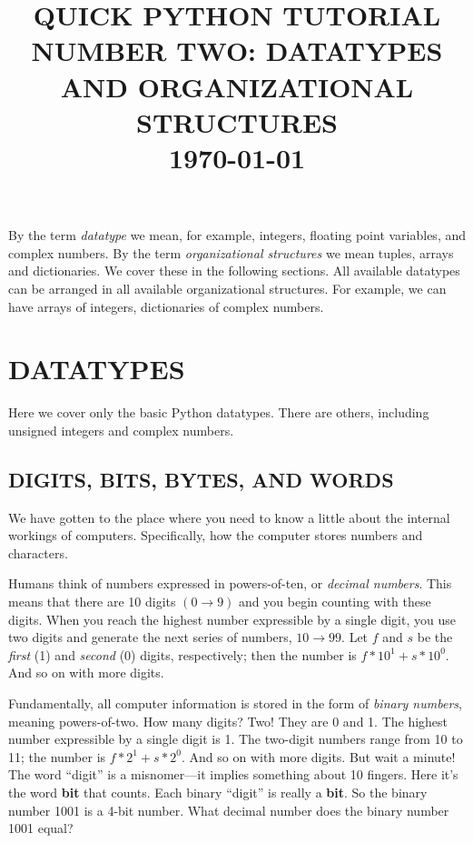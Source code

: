 \documentclass[psfig,preprint]{aastex}
\begin{document}
\title{\bf QUICK PYTHON TUTORIAL NUMBER TWO: DATATYPES AND ORGANIZATIONAL STRUCTURES\\ \today}

\tableofcontents
	

By the term {\it datatype} we mean, for example, integers,
floating point variables, and complex numbers.  By the term {\it
organizational structures} we mean tuples, arrays and
dictionaries.  We cover these in the following sections.  All
available datatypes can be arranged in all available organizational
structures.  For example, we can have arrays of integers, dictionaries of
complex numbers.

\section {DATATYPES}

	Here we cover only the basic Python datatypes.  There are others,
including unsigned integers and complex numbers. 

\subsection{DIGITS, BITS, BYTES, AND WORDS}

	We have gotten to the place where you need to know a little
about the internal workings of computers. Specifically, how the computer
stores numbers and characters.

	Humans think of numbers expressed in powers-of-ten, or {\it
decimal numbers}.  This means that there are 10 digits $(0 \rightarrow
9)$ and you begin counting with these digits.  When you reach the
highest number expressible by a single digit, you use two digits and
generate the next series of numbers, $10 \rightarrow 99$.  Let $f$ and
$s$ be the {\it first} (1) and {\it second} (0) digits, respectively; then the
number is $f*10^1 + s*10^0$.  And so on with more digits. 

	Fundamentally, all computer information is stored in the form of
{\it binary numbers}, meaning powers-of-two.  How many digits? Two! They
are 0 and 1.  The highest number expressible by a single digit is 1. 
The two-digit numbers range from 10 to 11; the number is $f*2^1 + s*2^0$.  And
so on with more digits.  But wait a minute! The word ``digit'' is a
misnomer---it implies something about 10 fingers.  Here it's the word
{\bf bit} that counts.  Each binary ``digit'' is really a {\bf bit}.  So
the binary number 1001 is a 4-bit number.  What decimal number does the
binary number 1001 equal?
\end{document}
